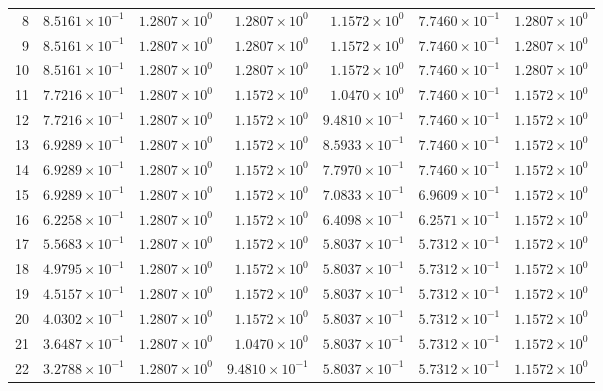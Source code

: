 \begin{table}[H]
\begin{tabular}{@{}rrrrrrr@{}}
8 & $8.5161\times10^{-1}$ & $1.2807\times10^{0}$ & $1.2807\times10^{0}$ & $1.1572\times10^{0}$ & $7.7460\times10^{-1}$ & $1.2807\times10^{0}$\\
9 & $8.5161\times10^{-1}$ & $1.2807\times10^{0}$ & $1.2807\times10^{0}$ & $1.1572\times10^{0}$ & $7.7460\times10^{-1}$ & $1.2807\times10^{0}$\\
10 & $8.5161\times10^{-1}$ & $1.2807\times10^{0}$ & $1.2807\times10^{0}$ & $1.1572\times10^{0}$ & $7.7460\times10^{-1}$ & $1.2807\times10^{0}$\\
11 & $7.7216\times10^{-1}$ & $1.2807\times10^{0}$ & $1.1572\times10^{0}$ & $1.0470\times10^{0}$ & $7.7460\times10^{-1}$ & $1.1572\times10^{0}$\\
12 & $7.7216\times10^{-1}$ & $1.2807\times10^{0}$ & $1.1572\times10^{0}$ & $9.4810\times10^{-1}$ & $7.7460\times10^{-1}$ & $1.1572\times10^{0}$\\
13 & $6.9289\times10^{-1}$ & $1.2807\times10^{0}$ & $1.1572\times10^{0}$ & $8.5933\times10^{-1}$ & $7.7460\times10^{-1}$ & $1.1572\times10^{0}$\\
14 & $6.9289\times10^{-1}$ & $1.2807\times10^{0}$ & $1.1572\times10^{0}$ & $7.7970\times10^{-1}$ & $7.7460\times10^{-1}$ & $1.1572\times10^{0}$\\
15 & $6.9289\times10^{-1}$ & $1.2807\times10^{0}$ & $1.1572\times10^{0}$ & $7.0833\times10^{-1}$ & $6.9609\times10^{-1}$ & $1.1572\times10^{0}$\\
16 & $6.2258\times10^{-1}$ & $1.2807\times10^{0}$ & $1.1572\times10^{0}$ & $6.4098\times10^{-1}$ & $6.2571\times10^{-1}$ & $1.1572\times10^{0}$\\
17 & $5.5683\times10^{-1}$ & $1.2807\times10^{0}$ & $1.1572\times10^{0}$ & $5.8037\times10^{-1}$ & $5.7312\times10^{-1}$ & $1.1572\times10^{0}$\\
18 & $4.9795\times10^{-1}$ & $1.2807\times10^{0}$ & $1.1572\times10^{0}$ & $5.8037\times10^{-1}$ & $5.7312\times10^{-1}$ & $1.1572\times10^{0}$\\
19 & $4.5157\times10^{-1}$ & $1.2807\times10^{0}$ & $1.1572\times10^{0}$ & $5.8037\times10^{-1}$ & $5.7312\times10^{-1}$ & $1.1572\times10^{0}$\\
20 & $4.0302\times10^{-1}$ & $1.2807\times10^{0}$ & $1.1572\times10^{0}$ & $5.8037\times10^{-1}$ & $5.7312\times10^{-1}$ & $1.1572\times10^{0}$\\
21 & $3.6487\times10^{-1}$ & $1.2807\times10^{0}$ & $1.0470\times10^{0}$ & $5.8037\times10^{-1}$ & $5.7312\times10^{-1}$ & $1.1572\times10^{0}$\\
22 & $3.2788\times10^{-1}$ & $1.2807\times10^{0}$ & $9.4810\times10^{-1}$ & $5.8037\times10^{-1}$ & $5.7312\times10^{-1}$ & $1.1572\times10^{0}$\\

\end{tabular}
\end{table}

